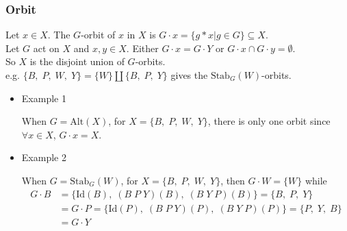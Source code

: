 \documentclass[11pt]{article}
\newcommand{\0}{\emptyset}
\begin{document}
\subsubsection*{Orbit}
\label{sec:orgb04ab70}
Let \(x\in X\). The \(G\)-orbit of \(x\) in \(X\) is \(G\cdot x=\{g*x|g\in G\}\subseteq X\).\\[0pt]
Let \(G\) act on \(X\) and \(x,y\in X\). Either \(G\cdot x= G\cdot Y\) or \(G\cdot x\cap G\cdot y=\0\).\\[0pt]
So \(X\) is the disjoint union of \(G\)-orbits.\\[0pt]
e.g. \(\{B,\;P,\;W,\;Y\}=\{W\}\coprod\{B,\;P,\;Y\}\) gives the \(\text{Stab}_{G}(W)\)-orbits.\\[0pt]
\begin{itemize}
\item Example 1
\label{sec:orga3e88dd}

When \(G=\text{Alt}(X)\), for \(X=\{B,\;P,\;W,\;Y\}\), there is only one orbit since \(\forall x\in X\), \(G\cdot x=X\).\\[0pt]
\item Example 2
\label{sec:org7ac73ff}

When \(G=\text{Stab}_{G}(W)\), for \(X=\{B,\;P,\;W,\;Y\}\), then \(G\cdot W=\{W\}\) while\\[0pt]
\begin{align*}
  G\cdot B
  &=\{\text{Id}(B),\;(B\;P\;Y)(B),\;(B\;Y\;P)(B)\}=\{B,\;P,\;Y\}
  \\&=G\cdot P=\{\text{Id}(P),\;(B\;P\;Y)(P),\;(B\;Y\;P)(P)\}=\{P,\;Y,\;B\}
  \\&=G\cdot Y
\end{align*}
\end{itemize}
\end{document}
